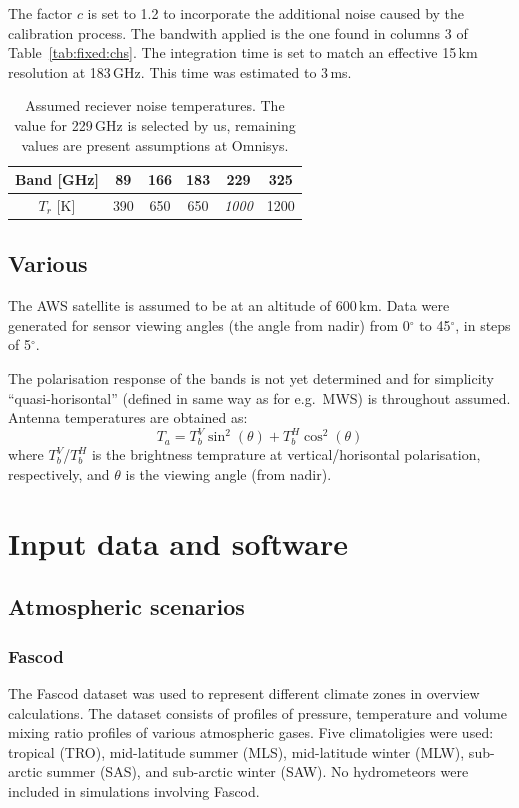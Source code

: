 \documentclass[12pt]{article}
\begin{document}
The factor $c$ is set to 1.2 to incorporate the additional noise caused by the
calibration process. The bandwith applied is the one found in columns 3 of
Table~\ref{tab:fixed:chs}. The integration time is set to match an effective
15\,km resolution at 183\,GHz. This time was estimated to 3\,ms. 

\begin{table}[!bt]
  \centering
  \begin{tabular}[b]{c|ccccc}
    Band [GHz]   & 89 & 166 & 183 & 229 & 325 \\
    \hline
    $T_r$ [K]    & 390 & 650 & 650 & {\it 1000}  & 1200 \\
    \hline
  \end{tabular}
  \caption{Assumed reciever noise temperatures. The value for 229\,GHz is
    selected by us, remaining values are present assumptions at Omnisys.}
  \label{tab:trec}
\end{table}

\subsection{Various}
%
The AWS satellite is assumed to be at an altitude of 600\,km. Data were
generated for sensor viewing angles (the angle from nadir) from 0$^\circ$ to
45$^\circ$, in steps of 5$^\circ$.

The polarisation response of the bands is not yet determined and for simplicity
``quasi-horisontal'' (defined in same way as for e.g.\ MWS) is throughout
assumed. Antenna temperatures are obtained as:
\begin{equation}
  \label{eq:polrot}
  T_a = T_b^V\sin^2(\theta) + T_b^H\cos^2(\theta)
\end{equation}
where $T_b^V$/$T_b^H$ is the brightness temprature at vertical/horisontal
polarisation, respectively, and $\theta$ is the viewing angle (from nadir).



\section{Input data and software}

\subsection{Atmospheric scenarios}

\subsubsection{Fascod}
\label{sec:fascod}
%
The Fascod dataset \citep{anderson1986afgl} was used to represent different
climate zones in overview calculations. The dataset consists of profiles of
pressure, temperature and volume mixing ratio profiles of various atmospheric
gases. Five climatoligies were used: tropical (TRO), mid-latitude summer (MLS),
mid-latitude winter (MLW), sub-arctic summer (SAS), and sub-arctic winter
(SAW). No hydrometeors were included in simulations involving Fascod.
\end{document}
